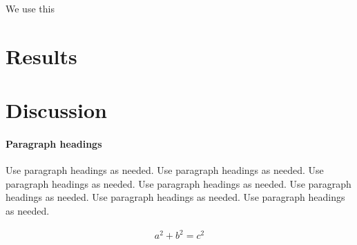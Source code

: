 \documentclass[smallextended]{svjour3}       %
\begin{document}
We use this 



\hypertarget{sec:5}{%
\section{Results}\label{sec:results}}

\hypertarget{sec:6}{%
\section{Discussion}\label{sec:discussion}}




\hypertarget{paragraph-headings}{%
\paragraph{Paragraph headings}\label{paragraph-headings}}

Use paragraph headings as needed. 
Use paragraph headings as needed. 
Use paragraph headings as needed. 
Use paragraph headings as needed. 
Use paragraph headings as needed. 
Use paragraph headings as needed. 
Use paragraph headings as needed. 

\begin{align}
a^2+b^2=c^2
\end{align}




\end{document}
